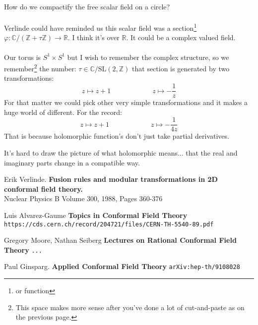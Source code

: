 \documentclass[12pt]{article}
\begin{document}
\noindent How do we compactify the free scalar field on a circle?  \\ \\
Verlinde could have reminded us this scalar field was a section\footnote{or function} $\varphi: \mathbb{C}/(\mathbb{Z} + \tau \mathbb{Z}) \to \mathbb{R}$.  I think it's over $\mathbb{R}$.  It could be a complex valued field. \\ \\
Our torus is $S^1 \times S^1$ but I wish to remember the complex structure, so we remember\footnote{This space makes more sense after you've done a lot of cut-and-paste as on the previous page.} the number: $\tau \in \mathbb{C} / \text{SL}(2, \mathbb{Z})$  that section is generated by two transformations:
$$z \mapsto z + 1 \hspace{1in} z \mapsto - \frac{1}{z} $$
For that matter we could pick other very simple transformations and it makes a huge world of different.  For the record:
$$z \mapsto z + 1 \hspace{1in} z \mapsto - \frac{1}{4z} $$
That is because holomorphic function's don't just take partial derivatives.

\newpage

\noindent 

It's hard to draw the picture of what holomorphic means... that the real and imaginary parts change in a compatible way.

\newpage

\noindent 

\newpage

\selectfont \fontsize{12}{10}\selectfont


\begin{thebibliography}{}

\item Erik Verlinde. \textbf{Fusion rules and modular transformations in 2D conformal field theory.} \\ Nuclear Physics B
Volume 300, 1988, Pages 360-376

\item Luis Alvarez-Gaume \textbf{Topics in Conformal Field Theory} \\ \texttt{https://cds.cern.ch/record/204721/files/CERN-TH-5540-89.pdf}

\item Gregory Moore, Nathan Seiberg \textbf{Lectures on Rational Conformal Field Theory} \texttt{...}

\item Paul Ginsparg.  \textbf{Applied Conformal Field Theory} \texttt{arXiv:hep-th/9108028}


\end{thebibliography}
\end{document}
